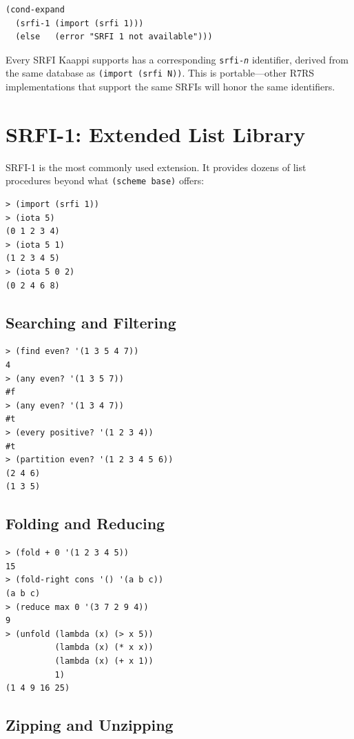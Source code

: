 \begin{lstlisting}
(cond-expand
  (srfi-1 (import (srfi 1)))
  (else   (error "SRFI 1 not available")))
\end{lstlisting}

Every SRFI Kaappi supports has a corresponding \texttt{srfi-\emph{n}} identifier, derived from the same database as \texttt{(import (srfi N))}. This is portable---other R7RS implementations that support the same SRFIs will honor the same identifiers.

\section{SRFI-1: Extended List Library}

SRFI-1 is the most commonly used extension. It provides dozens of list procedures beyond what \texttt{(scheme base)} offers:

\begin{lstlisting}[style=repl]
> (import (srfi 1))
> (iota 5)
(0 1 2 3 4)
> (iota 5 1)
(1 2 3 4 5)
> (iota 5 0 2)
(0 2 4 6 8)
\end{lstlisting}

\subsection{Searching and Filtering}

\begin{lstlisting}[style=repl]
> (find even? '(1 3 5 4 7))
4
> (any even? '(1 3 5 7))
#f
> (any even? '(1 3 4 7))
#t
> (every positive? '(1 2 3 4))
#t
> (partition even? '(1 2 3 4 5 6))
(2 4 6)
(1 3 5)
\end{lstlisting}

\subsection{Folding and Reducing}

\begin{lstlisting}[style=repl]
> (fold + 0 '(1 2 3 4 5))
15
> (fold-right cons '() '(a b c))
(a b c)
> (reduce max 0 '(3 7 2 9 4))
9
> (unfold (lambda (x) (> x 5))
          (lambda (x) (* x x))
          (lambda (x) (+ x 1))
          1)
(1 4 9 16 25)
\end{lstlisting}

\subsection{Zipping and Unzipping}

